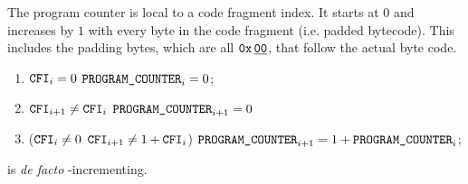 The program counter \romColumnProgramCounter{} is local to a code fragment index.
It starts at $0$ and increases by $1$ with every byte in the code fragment (i.e. padded bytecode).
This includes the padding bytes, which are all $\texttt{0x\,}\underline{\texttt{00}}$, that follow the actual byte code.
\begin{enumerate}
    \item \If $\texttt{CFI} _{i} = 0$ \Then $\texttt{PROGRAM\_COUNTER} _{i} = 0$;
    \item \If $\texttt{CFI} _{i + 1} \neq \texttt{CFI} _{i}$ \Then $\texttt{PROGRAM\_COUNTER} _{i + 1} = 0$
    \item \If \Big($\texttt{CFI} _{i} \neq 0$ \et $\texttt{CFI} _{i + 1} \neq 1 + \texttt{CFI} _{i}$\Big) \Then $\texttt{PROGRAM\_COUNTER} _{i + 1} = 1 + \texttt{PROGRAM\_COUNTER} _{i}$;
\end{enumerate}
\saNote{}
\romColumnProgramCounter{} is \emph{de facto} \romColumnCfi-incrementing.

